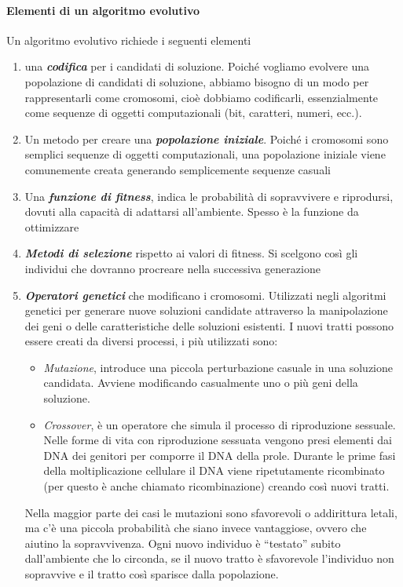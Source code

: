 \paragraph{Elementi di un algoritmo evolutivo}
Un algoritmo evolutivo richiede i seguenti elementi
\begin{enumerate}
    \item una \textbf{\textit{codifica}} per i candidati di soluzione. Poiché vogliamo evolvere una popolazione di candidati di soluzione, abbiamo bisogno di un modo per rappresentarli come cromosomi, cioè dobbiamo codificarli, essenzialmente come sequenze di oggetti computazionali (bit, caratteri, numeri, ecc.).
    \item Un metodo per creare una \textbf{\textit{popolazione iniziale}}. Poiché i cromosomi sono semplici sequenze di oggetti computazionali, una popolazione iniziale viene comunemente creata generando semplicemente sequenze casuali
    \item Una \textbf{\textit{funzione di fitness}}, indica le probabilità di sopravvivere e riprodursi, dovuti alla capacità di adattarsi all’ambiente. Spesso è la funzione da ottimizzare
    \item \textbf{\textit{Metodi di selezione}} rispetto ai valori di fitness. Si scelgono così gli individui che dovranno procreare nella successiva generazione
    \item \textbf{\textit{Operatori genetici}} che modificano i cromosomi. Utilizzati negli algoritmi genetici per generare nuove soluzioni candidate attraverso la manipolazione dei geni o delle caratteristiche delle soluzioni esistenti. I nuovi tratti possono essere creati da diversi processi, i più utilizzati sono:
    \begin{itemize}
        \item \textit{Mutazione}, introduce una piccola perturbazione casuale in una soluzione candidata. Avviene modificando casualmente uno o più geni della soluzione.
        \item \textit{Crossover}, è un operatore che simula il processo di riproduzione sessuale. Nelle forme di vita con riproduzione sessuata vengono presi elementi dai DNA dei genitori per comporre il DNA della prole. Durante le prime fasi della moltiplicazione cellulare il DNA viene ripetutamente ricombinato (per questo è anche chiamato ricombinazione) creando così nuovi tratti.
    \end{itemize}

    Nella maggior parte dei casi le mutazioni sono sfavorevoli o addirittura letali, ma c’è una piccola probabilità che siano invece vantaggiose, ovvero che aiutino la sopravvivenza. Ogni nuovo individuo è “testato” subito dall’ambiente che lo circonda, se il nuovo tratto è sfavorevole l’individuo non sopravvive e il tratto così sparisce dalla popolazione.
    

\end{enumerate}
